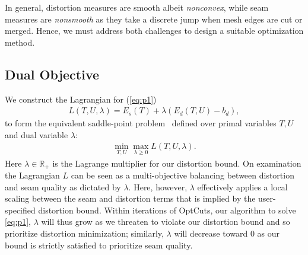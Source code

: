 In general, distortion measures are smooth albeit \emph{nonconvex}, while seam measures are \emph{nonsmooth} as they take a discrete jump when mesh edges are cut or merged. Hence, we must address both challenges to design a suitable optimization method. 

%


\subsection{Dual Objective}
We construct the Lagrangian for (\ref{eq:p1})  %
\begin{align}
	L(T,U,\lambda) = E_s(T) + \lambda(E_d(T,U) - b_d),
	\label{eq:L}
\end{align}
%
to form the equivalent saddle-point problem~\cite{Bertsekas:2016:NOP} defined over primal variables $T,U$ and dual variable $\lambda$:
%
\begin{align}
	\min_{T,U} \max_{\lambda\geq0} L(T,U,\lambda).
	\label{eq:p2}
\end{align}
%
Here $\lambda \in \mathbb{R_+}$ is the Lagrange multiplier for our distortion bound. On examination the Lagrangian $L$ can be seen as a multi-objective balancing between distortion and seam quality as dictated by $\lambda$. Here, however, $\lambda$ effectively applies a local scaling between the seam and distortion terms that is implied %
by the user-specified distortion bound. Within iterations of OptCuts, our algorithm to solve \eqref{eq:p1}, $\lambda$ will thus grow as we threaten to violate our distortion bound and so prioritize distortion minimization; similarly, $\lambda$ will decrease toward $0$ as our bound is strictly satisfied to prioritize seam quality.


